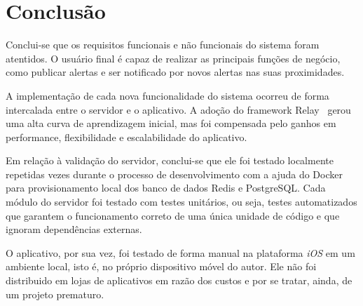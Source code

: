\chapter{Conclusão}
\label{c.conclusao}

Conclui-se que os requisitos funcionais e não funcionais do sistema foram atentidos. O usuário final é capaz de realizar as principais funções de negócio, como publicar alertas e ser notificado por novos alertas nas suas proximidades. 

A implementação de cada nova funcionalidade do sistema ocorreu de forma intercalada entre o servidor e o aplicativo. A adoção do framework Relay~\cite{relay} gerou uma alta curva de aprendizagem inicial, mas foi compensada pelo ganhos em performance, flexibilidade e escalabilidade do aplicativo.

Em relação à validação do servidor, conclui-se que ele foi testado localmente repetidas vezes durante o processo de desenvolvimento com a ajuda do Docker~\cite{docker} para provisionamento local dos banco de dados Redis e PostgreSQL. Cada módulo do servidor foi testado com testes unitários, ou seja, testes automatizados que garantem o funcionamento correto de uma única unidade de código e que ignoram dependências externas. 

O aplicativo, por sua vez, foi testado de forma manual na plataforma \emph{iOS} em um ambiente local, isto é, no próprio dispositivo móvel do autor. Ele não foi distribuido em lojas de aplicativos em razão dos custos e por se tratar, ainda, de um projeto prematuro.


